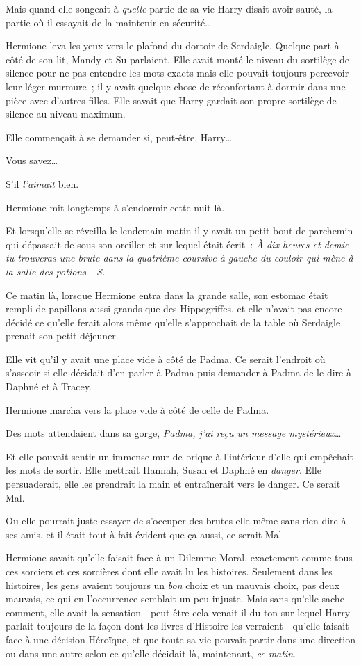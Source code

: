 Mais quand elle songeait à \emph{quelle} partie de sa vie Harry disait avoir sauté, la partie où il essayait de la maintenir en sécurité…

Hermione leva les yeux vers le plafond du dortoir de Serdaigle. Quelque part à côté de son lit, Mandy et Su parlaient. Elle avait monté le niveau du sortilège de silence pour ne pas entendre les mots exacts mais elle pouvait toujours percevoir leur léger murmure~; il y avait quelque chose de réconfortant à dormir dans une pièce avec d'autres filles. Elle savait que Harry gardait son propre sortilège de silence au niveau maximum.

Elle commençait à se demander si, peut-être, Harry…

Vous savez…

S'il \emph{l'aimait} bien.

Hermione mit longtemps à s'endormir cette nuit-là.

Et lorsqu'elle se réveilla le lendemain matin il y avait un petit bout de parchemin qui dépassait de sous son oreiller et sur lequel était écrit~: \emph{À dix heures et demie tu trouveras une brute dans la quatrième coursive à gauche du couloir qui mène à la salle des potions - S.}

\later

Ce matin là, lorsque Hermione entra dans la grande salle, son estomac était rempli de papillons aussi grands que des Hippogriffes, et elle n'avait pas encore décidé ce qu'elle ferait alors même qu'elle s'approchait de la table où Serdaigle prenait son petit déjeuner.

Elle vit qu'il y avait une place vide à côté de Padma. Ce serait l'endroit où s'asseoir si elle décidait d'en parler à Padma puis demander à Padma de le dire à Daphné et à Tracey.

Hermione marcha vers la place vide à côté de celle de Padma.

Des mots attendaient dans sa gorge, \emph{Padma, j'ai reçu un message mystérieux}…

Et elle pouvait sentir un immense mur de brique à l'intérieur d'elle qui empêchait les mots de sortir. Elle mettrait Hannah, Susan et Daphné en \emph{danger}. Elle persuaderait, elle les prendrait la main et entraînerait vers le danger. Ce serait Mal.

Ou elle pourrait juste essayer de s'occuper des brutes elle-même sans rien dire à ses amis, et il était tout à fait évident que ça aussi, ce serait Mal.

Hermione savait qu'elle faisait face à un Dilemme Moral, exactement comme tous ces sorciers et ces sorcières dont elle avait lu les histoires. Seulement dans les histoires, les gens avaient toujours un \emph{bon} choix et un mauvais choix, pas deux mauvais, ce qui en l'occurrence semblait un peu injuste. Mais sans qu'elle sache comment, elle avait la sensation - peut-être cela venait-il du ton sur lequel Harry parlait toujours de la façon dont les livres d'Histoire les verraient - qu'elle faisait face à une décision Héroïque, et que toute sa vie pouvait partir dans une direction ou dans une autre selon ce qu'elle décidait là, maintenant, \emph{ce matin}.

